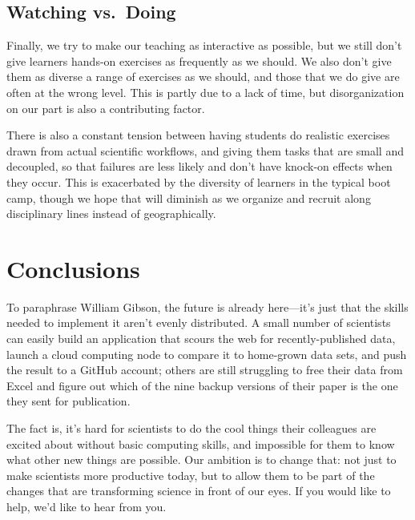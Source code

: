 \documentclass{article}
\begin{document}
\subsection{Watching vs.~Doing}

Finally, we try to make our teaching as interactive as possible, but we
still don't give learners hands-on exercises as frequently as we should.
We also don't give them as diverse a range of exercises as we should,
and those that we do give are often at the wrong level. This is partly
due to a lack of time, but disorganization on our part is also a
contributing factor.

There is also a constant tension between having students do realistic
exercises drawn from actual scientific workflows, and giving them tasks
that are small and decoupled, so that failures are less likely and don't
have knock-on effects when they occur. This is exacerbated by the
diversity of learners in the typical boot camp, though we hope that will
diminish as we organize and recruit along disciplinary lines instead of
geographically.

\section{Conclusions}

To paraphrase William Gibson, the future is already here---it's just
that the skills needed to implement it aren't evenly distributed. A
small number of scientists can easily build an application that scours
the web for recently-published data, launch a cloud computing node to
compare it to home-grown data sets, and push the result to a GitHub
account; others are still struggling to free their data from Excel and
figure out which of the nine backup versions of their paper is the one
they sent for publication.

The fact is, it's hard for scientists to do the cool things their
colleagues are excited about without basic computing skills, and
impossible for them to know what other new things are possible. Our
ambition is to change that: not just to make scientists more productive
today, but to allow them to be part of the changes that are transforming
science in front of our eyes. If you would like to help, we'd like to
hear from you.



\end{document}

